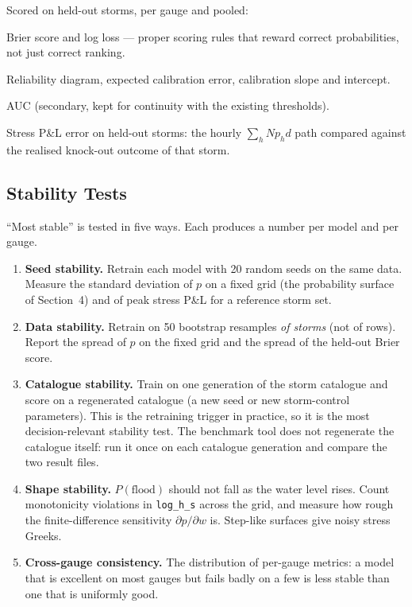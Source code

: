 \documentclass[11pt,a4paper]{article}
\begin{document}
Scored on held-out storms, per gauge and pooled:
\begin{description}[leftmargin=2em]
  \item[Primary] Brier score and log loss --- proper scoring rules
        that reward correct probabilities, not just correct ranking.
  \item[Calibration] Reliability diagram, expected calibration error,
        calibration slope and intercept.
  \item[Discrimination] AUC (secondary, kept for continuity with
        the existing thresholds).
  \item[Business] Stress P\&L error on held-out storms: the hourly
        $\sum_h N p_h d$ path compared against the realised
        knock-out outcome of that storm.
\end{description}

\subsection{Stability Tests}

``Most stable'' is tested in five ways.  Each produces a number per
model and per gauge.

\begin{enumerate}
  \item \textbf{Seed stability.}  Retrain each model with 20 random
        seeds on the same data.  Measure the standard deviation of
        $p$ on a fixed grid (the probability surface of
        Section~4) and of peak stress P\&L for a reference storm set.
  \item \textbf{Data stability.}  Retrain on 50 bootstrap resamples
        \emph{of storms} (not of rows).  Report the spread of $p$ on
        the fixed grid and the spread of the held-out Brier score.
  \item \textbf{Catalogue stability.}  Train on one generation of the
        storm catalogue and score on a regenerated catalogue
        (a new seed or new storm-control parameters).  This is the
        retraining trigger in practice, so it is the most
        decision-relevant stability test.  The benchmark tool does not
        regenerate the catalogue itself: run it once on each catalogue
        generation and compare the two result files.
  \item \textbf{Shape stability.}  $P(\text{flood})$ should not fall
        as the water level rises.  Count monotonicity violations in
        \texttt{log\_h\_s} across the grid, and measure how rough the
        finite-difference sensitivity $\partial p / \partial w$ is.
        Step-like surfaces give noisy stress Greeks.
  \item \textbf{Cross-gauge consistency.}  The distribution of
        per-gauge metrics: a model that is excellent on most gauges
        but fails badly on a few is less stable than one that is
        uniformly good.
\end{enumerate}
\end{document}
